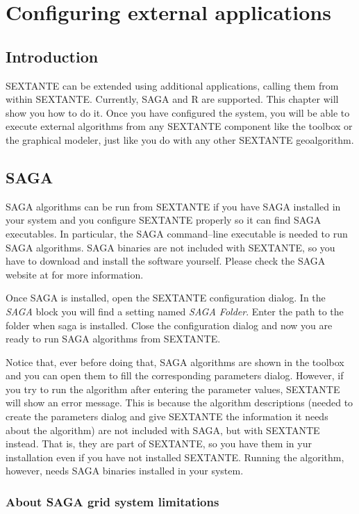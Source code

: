 \chapter{Configuring external applications}

\section{Introduction}

SEXTANTE can be extended using additional applications, calling them from within SEXTANTE. Currently, SAGA and R are supported. This chapter will show you how to do it. Once you have configured the system, you will be able to execute external algorithms from any SEXTANTE component like the toolbox or the graphical modeler, just like you do with any other SEXTANTE geoalgorithm.


\section{SAGA}

SAGA algorithms can be run from SEXTANTE if you have SAGA installed in your system and you configure SEXTANTE properly so it can find SAGA executables. In particular, the SAGA command--line executable is needed to run SAGA algorithms. SAGA binaries are not included with SEXTANTE, so you have to download and install the software yourself. Please check the SAGA website at \texttt{} for more information.

Once SAGA is installed, open the SEXTANTE configuration dialog. In the \emph{SAGA} block you will find a setting named \emph{SAGA Folder}. Enter the path to the folder when saga is installed. Close the configuration dialog and now you are ready to run SAGA algorithms from SEXTANTE.

Notice that, ever before doing that, SAGA algorithms are shown in the toolbox and you can open them to fill the corresponding parameters dialog. However, if you try to run the algorithm after entering the parameter values, SEXTANTE will show an error message. This is because the algorithm descriptions (needed to create the parameters dialog and give SEXTANTE the information it needs about the algorithm) are not included with SAGA, but with SEXTANTE instead. That is, they are part of SEXTANTE, so you have them in yur installation even if you have not installed SEXTANTE. Running the algorithm, however, needs SAGA binaries installed in your system.

\subsection{About SAGA grid system limitations}

